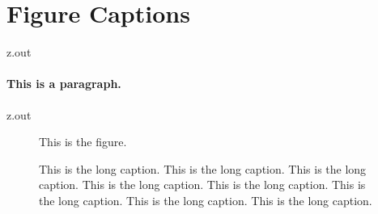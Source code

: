 \section{Figure Captions}


\begin{VerbatimOut}{z.out}

\paragraph{This is a paragraph.}
\end{VerbatimOut}

\MyIO


\begin{VerbatimOut}{z.out}

\begin{figure}[ht]
  \centering
    This is the figure.
  \caption[A short caption for the list of figures.]{%
    This is the long caption.  This is the long caption.
    This is the long caption.  This is the long caption.
    This is the long caption.  This is the long caption.
    This is the long caption.  This is the long caption.%
  }
\end{figure}
\end{VerbatimOut}

\MyIO
